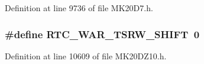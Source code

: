 Definition at line 9736 of file M\+K20\+D7.\+h.

\subsubsection[{\texorpdfstring{R\+T\+C\+\_\+\+W\+A\+R\+\_\+\+T\+S\+R\+W\+\_\+\+S\+H\+I\+FT}{RTC_WAR_TSRW_SHIFT}}]{\setlength{\rightskip}{0pt plus 5cm}\#define R\+T\+C\+\_\+\+W\+A\+R\+\_\+\+T\+S\+R\+W\+\_\+\+S\+H\+I\+FT~0}\hypertarget{group___r_t_c___register___masks_gabf5ee77e5695cd42b86430a86ae7208e}{}\label{group___r_t_c___register___masks_gabf5ee77e5695cd42b86430a86ae7208e}


Definition at line 10609 of file M\+K20\+D\+Z10.\+h.

